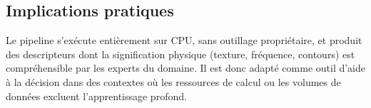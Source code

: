 \subsection{Implications pratiques}

Le pipeline s'exécute entièrement sur CPU, sans outillage propriétaire, et produit
des descripteurs dont la signification physique (texture, fréquence, contours) est
compréhensible par les experts du domaine. Il est donc adapté comme outil d'aide
à la décision dans des contextes où les ressources de calcul ou les volumes de
données excluent l'apprentissage profond.
